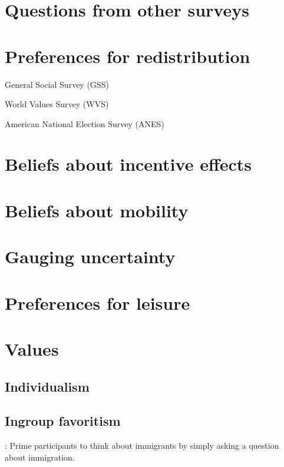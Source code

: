 \documentclass[12pt]{article}
\begin{document}
\section*{Questions from other surveys}

\section{Preferences for redistribution}

    General Social Survey (GSS)
    
    World Values Survey (WVS)
    
    American National Election Survey (ANES)

\section{Beliefs about incentive effects}

    \cite{stantcheva2021understanding}

\section{Beliefs about mobility}

\section{Gauging uncertainty}

\section{Preferences for leisure}

\section{Values}

    \subsection{Individualism}

    \subsection{Ingroup favoritism}

        \cite{alesina2023immigration}: Prime participants to think about immigrants by simply asking a question about immigration.
\end{document}
